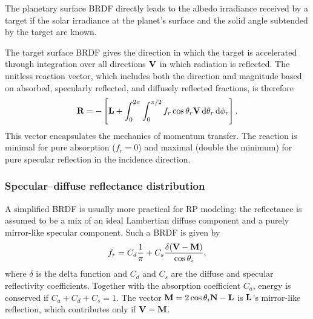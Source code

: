 The planetary surface \gls{BRDF} directly leads to the albedo irradiance received by a target if the solar irradiance at the planet's surface and the solid angle subtended by the target are known.

The target surface \gls{BRDF} gives the direction in which the target is accelerated through integration over all directions $\vb V$ in which radiation is reflected. The unitless reaction vector, which includes both the direction and magnitude based on absorbed, specularly reflected, and diffusely reflected fractions, is therefore~\cite{Wetterer2014}
\begin{align}
    \label{eq:brdf-reaction-general}
    \vb R = -\left[ \vb L + \int_{0}^{2\pi} \int_{0}^{\pi/2} f_r \cos\theta_r \vb V \dd{\theta_r} \dd{\phi_r} \right].
\end{align}
This vector encapsulates the mechanics of momentum transfer. The reaction is minimal for pure absorption ($f_r = 0$) and maximal (double the minimum) for pure specular reflection in the incidence direction.

\subsubsection{Specular--diffuse reflectance distribution}
A simplified \gls{BRDF} is usually more practical for \gls{RP} modeling: the reflectance is assumed to be a mix of an ideal Lambertian diffuse component and a purely mirror-like specular component. Such a \gls{BRDF} is given by~\cite{Wetterer2014}
\begin{align}
    \label{eq:brdf-specular-diffuse}
    f_r = C_d \frac{1}{\pi} + C_s \frac{\delta(\vb V - \vb M)}{\cos \theta_i},
\end{align}
where $\delta$ is the delta function and $C_d$ and $C_s$ are the diffuse and specular reflectivity coefficients. Together with the absorption coefficient $C_a$, energy is conserved if $C_a + C_d + C_s = 1$. The vector $\vb M = 2\cos\theta_i\vb N - \vb L$ is $\vb L$'s mirror-like reflection, which contributes only if $\vb V = \vb M$.

